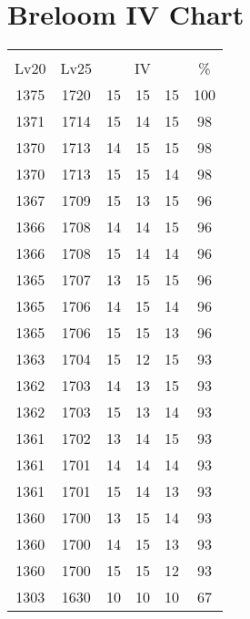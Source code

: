 \documentclass{article}%
\begin{document}
%
\normalsize%
\section{Breloom IV Chart}%
\label{sec:Breloom IV Chart}%
\renewcommand{\arraystretch}{1.5}%
\begin{tabular}{|c|c|c|c|c|c|}%
\hline%
\multicolumn{6}{|c|}{\textcolor{white}{ 
\linebreak{Breloom}
}%
\cellcolor{black}}\\%
\multicolumn{1}{|c}{Lv20}&\multicolumn{1}{c|}{Lv25}&\multicolumn{3}{c|}{IV}&\multicolumn{1}{|c|}{\%}\\%
\hline%
\rowcolor{color100}%
1375&1720&15&15&15&100\\%
\hline%
\rowcolor{color98}%
1371&1714&15&14&15&98\\%
\hline%
\rowcolor{color98}%
1370&1713&14&15&15&98\\%
\hline%
\rowcolor{color98}%
1370&1713&15&15&14&98\\%
\hline%
\rowcolor{color96}%
1367&1709&15&13&15&96\\%
\hline%
\rowcolor{color96}%
1366&1708&14&14&15&96\\%
\hline%
\rowcolor{color96}%
1366&1708&15&14&14&96\\%
\hline%
\rowcolor{color96}%
1365&1707&13&15&15&96\\%
\hline%
\rowcolor{color96}%
1365&1706&14&15&14&96\\%
\hline%
\rowcolor{color96}%
1365&1706&15&15&13&96\\%
\hline%
\rowcolor{color93}%
1363&1704&15&12&15&93\\%
\hline%
\rowcolor{color93}%
1362&1703&14&13&15&93\\%
\hline%
\rowcolor{color93}%
1362&1703&15&13&14&93\\%
\hline%
\rowcolor{color93}%
1361&1702&13&14&15&93\\%
\hline%
\rowcolor{color93}%
1361&1701&14&14&14&93\\%
\hline%
\rowcolor{color93}%
1361&1701&15&14&13&93\\%
\hline%
\rowcolor{color93}%
1360&1700&13&15&14&93\\%
\hline%
\rowcolor{color93}%
1360&1700&14&15&13&93\\%
\hline%
\rowcolor{color93}%
1360&1700&15&15&12&93\\%
\hline%
\rowcolor{color91}%
1303&1630&10&10&10&67\\%
\end{tabular}

%
\end{document}
